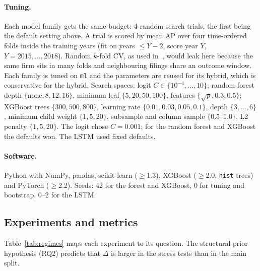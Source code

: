 \paragraph{Tuning.} Each model family gets the same budget: 4 random-search trials, the first being the
default setting above. A trial is scored by mean AP over four time-ordered folds inside the training years
(fit on years $\le Y-2$, score year $Y$, $Y=2015,\ldots,2018$). Random $k$-fold CV, as used
in~\cite{moscatelli2020}, would leak here because the same firm sits in many folds and neighbouring filings
share an outcome window. Each family is tuned on \texttt{ml} and the parameters are reused for its hybrid, which
is conservative for the hybrid. Search spaces: logit $C\in\{10^{-4},\ldots,10\}$; random forest depth
$\{\mbox{none},8,12,16\}$, minimum leaf $\{5,20,50,100\}$, features $\{\sqrt{p},0.3,0.5\}$; XGBoost trees
$\{300,500,800\}$, learning rate $\{0.01,0.03,0.05,0.1\}$, depth $\{3,\ldots,6\}$, minimum child weight
$\{1,5,20\}$, subsample and column sample $\{0.5\mbox{--}1.0\}$, L2 penalty $\{1,5,20\}$. The logit chose
$C=0.001$; for the random forest and XGBoost the defaults won. The LSTM used fixed defaults.

\paragraph{Software.} Python with NumPy, pandas, scikit-learn ($\ge$1.3), XGBoost ($\ge$2.0, \texttt{hist} trees)
and PyTorch ($\ge$2.2). Seeds: 42 for the forest and XGBoost, 0 for tuning and bootstrap, 0--2 for the LSTM.

\subsection{Experiments and metrics}
\label{sec:metrics}

Table~\ref{tab:regimes} maps each experiment to its question. The structural-prior hypothesis (RQ2)
predicts that $\Delta$ is larger in the stress tests than in the main split.


